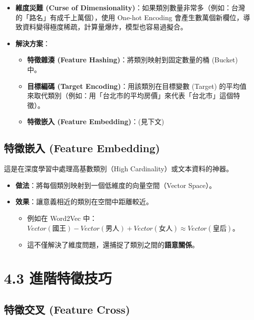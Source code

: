 \documentclass[
  letterpaper,
  DIV=11,
  numbers=noendperiod]{scrreprt}
\providecommand{\tightlist}{%
  \setlength{\itemsep}{0pt}\setlength{\parskip}{0pt}}
\begin{document}
\begin{itemize}
\tightlist
\item
  \textbf{維度災難 (Curse of
  Dimensionality)}：如果類別數量非常多（例如：台灣的「路名」有成千上萬個），使用
  One-hot Encoding
  會產生數萬個新欄位，導致資料變得極度稀疏，計算量爆炸，模型也容易過擬合。
\item
  \textbf{解決方案}：

  \begin{itemize}
  \tightlist
  \item
    \textbf{特徵雜湊 (Feature Hashing)}：將類別映射到固定數量的桶
    (Bucket) 中。
  \item
    \textbf{目標編碼 (Target Encoding)}：用該類別在目標變數 (Target)
    的平均值來取代類別（例如：用「台北市的平均房價」來代表「台北市」這個特徵）。
  \item
    \textbf{特徵嵌入 (Feature Embedding)}：(見下文)
  \end{itemize}
\end{itemize}

\section{特徵嵌入 (Feature
Embedding)}\label{ux7279ux5fb5ux5d4cux5165-feature-embedding}

這是在深度學習中處理高基數類別（High Cardinality）或文本資料的神器。

\begin{itemize}
\tightlist
\item
  \textbf{做法}：將每個類別映射到一個低維度的向量空間（Vector Space）。
\item
  \textbf{效果}：讓意義相近的類別在空間中距離較近。

  \begin{itemize}
  \tightlist
  \item
    例如在 Word2Vec
    中：\(Vector(國王) - Vector(男人) + Vector(女人) \approx Vector(皇后)\)。
  \item
    這不僅解決了維度問題，還捕捉了類別之間的\textbf{語意關係}。
  \end{itemize}
\end{itemize}

\chapter{4.3 進階特徵技巧}\label{sec-advanced-features}

\section{特徵交叉 (Feature
Cross)}\label{ux7279ux5fb5ux4ea4ux53c9-feature-cross}
\end{document}
